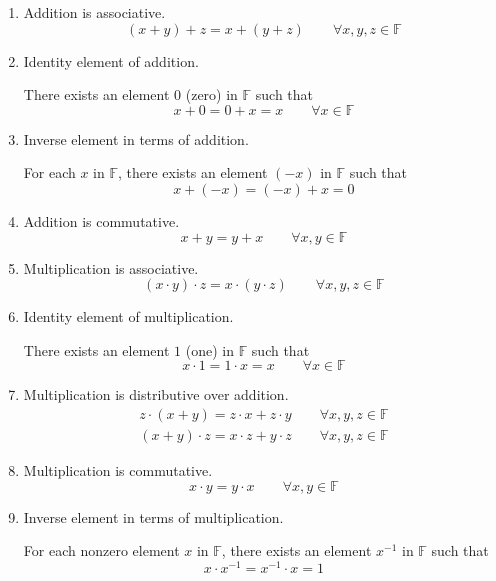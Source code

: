 \begin{enumerate}[label = (\arabic*)]
    \item Addition is associative.
        \[
            (x + y) + z = x + (y + z)\qquad\forall x, y, z\in\mathbb{F}
        \]
    \item Identity element of addition.

        There exists an element $0$ (zero) in $\mathbb{F}$ such that
        \[
            x + 0 = 0 + x = x\qquad\forall x\in\mathbb{F}
        \]
    \item Inverse element in terms of addition.

        For each $x$ in $\mathbb{F}$, there exists an element $(-x)$ in $\mathbb{F}$ such that
        \[
            x + (-x) = (-x) + x = 0
        \]
    \item Addition is commutative.
        \[
            x + y = y + x\qquad\forall x, y\in\mathbb{F}
        \]
    \item Multiplication is associative.
        \[
            (x\cdot y)\cdot z = x\cdot (y\cdot z)\qquad\forall x, y, z\in\mathbb{F}
        \]
    \item Identity element of multiplication.

        There exists an element $1$ (one) in $\mathbb{F}$ such that
        \[
            x\cdot 1 = 1\cdot x = x\qquad\forall x\in\mathbb{F}
        \]
    \item Multiplication is distributive over addition.
        \[
            \begin{split}
                z\cdot (x + y) = z\cdot x + z\cdot y\qquad\forall x, y, z\in\mathbb{F} \\
                (x + y)\cdot z = x\cdot z + y\cdot z\qquad\forall x, y, z\in\mathbb{F}
            \end{split}
        \]
    \item Multiplication is commutative.
        \[
            x\cdot y = y\cdot x\qquad\forall x, y\in\mathbb{F}
        \]
    \item Inverse element in terms of multiplication.

        For each nonzero element $x$ in $\mathbb{F}$, there exists an element $x^{-1}$ in $\mathbb{F}$ such that
        \[
            x\cdot x^{-1} = x^{-1}\cdot x = 1
        \]
\end{enumerate}

